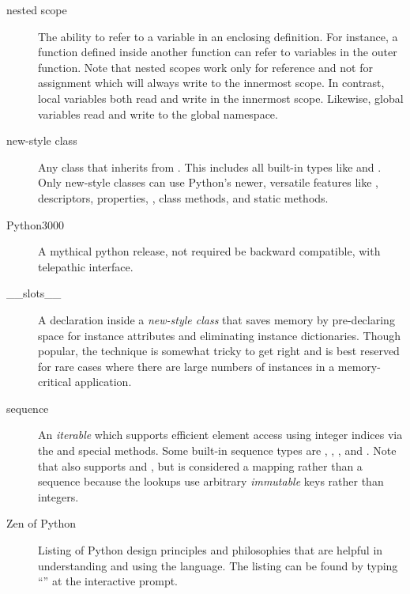 \begin{description}
\item[nested scope]
The ability to refer to a variable in an enclosing definition.  For
instance, a function defined inside another function can refer to
variables in the outer function.  Note that nested scopes work only
for reference and not for assignment which will always write to the
innermost scope.  In contrast, local variables both read and write in
the innermost scope.  Likewise, global variables read and write to the
global namespace.

\item[new-style class]
Any class that inherits from .  This includes all
built-in types like  and .  Only new-style
classes can use Python's newer, versatile features like
{}, descriptors, properties,
, class methods, and static methods.

\item[Python3000]
A mythical python release, not required be backward compatible, with
telepathic interface.

\item[__slots__]
A declaration inside a \emph{new-style class} that saves memory by
pre-declaring space for instance attributes and eliminating instance
dictionaries.  Though popular, the technique is somewhat tricky to get
right and is best reserved for rare cases where there are large
numbers of instances in a memory-critical application.

\item[sequence]
An \emph{iterable} which supports efficient element access using
integer indices via the  and
{} special methods.  Some built-in sequence types
are , , , and .
Note that  also supports  and
{}, but is considered a mapping rather than a
sequence because the lookups use arbitrary \emph{immutable} keys
rather than integers.

\item[Zen of Python]
Listing of Python design principles and philosophies that are helpful
in understanding and using the language.  The listing can be found by
typing ``'' at the interactive prompt.

\end{description}
